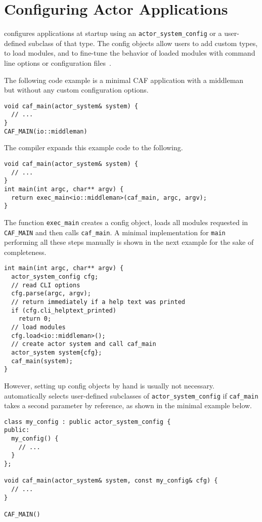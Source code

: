 \section{Configuring Actor Applications}
\label{system-config}

\lib configures applications at startup using an \lstinline^actor_system_config^ or a user-defined subclass of that type. The config objects allow users to add custom types, to load modules, and to fine-tune the behavior of loaded modules with command line options or configuration files~.

The following code example is a minimal CAF application with a middleman~ but without any custom configuration options.

\begin{lstlisting}
void caf_main(actor_system& system) {
  // ...
}
CAF_MAIN(io::middleman)
\end{lstlisting}

The compiler expands this example code to the following.

\begin{lstlisting}
void caf_main(actor_system& system) {
  // ...
}
int main(int argc, char** argv) {
  return exec_main<io::middleman>(caf_main, argc, argv);
}
\end{lstlisting}

The function \lstinline^exec_main^ creates a config object, loads all modules requested in \lstinline^CAF_MAIN^ and then calls \lstinline^caf_main^. A minimal implementation for \lstinline^main^ performing all these steps manually is shown in the next example for the sake of completeness.

\begin{lstlisting}
int main(int argc, char** argv) {
  actor_system_config cfg;
  // read CLI options
  cfg.parse(argc, argv);
  // return immediately if a help text was printed
  if (cfg.cli_helptext_printed)
    return 0;
  // load modules
  cfg.load<io::middleman>();
  // create actor system and call caf_main
  actor_system system{cfg};
  caf_main(system);
}
\end{lstlisting}

However, setting up config objects by hand is usually not necessary. \lib automatically selects user-defined subclasses of \lstinline^actor_system_config^ if \lstinline^caf_main^ takes a second parameter by reference, as shown in the minimal example below.

\begin{lstlisting}
class my_config : public actor_system_config {
public:
  my_config() {
    // ...
  }
};

void caf_main(actor_system& system, const my_config& cfg) {
  // ...
}

CAF_MAIN()
\end{lstlisting}

